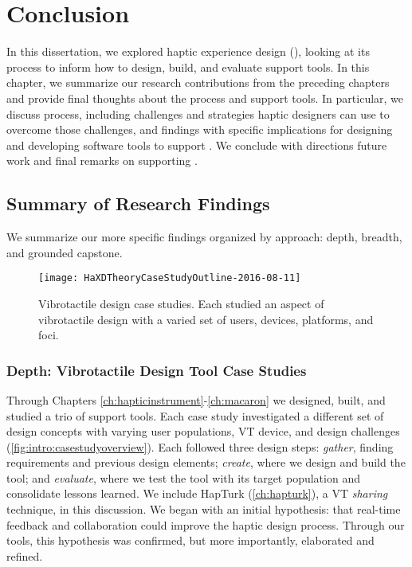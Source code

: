 \chapter{Conclusion}
\label{ch:conclusion}
In this dissertation, we explored haptic experience design (\haxd), looking at its process to inform how to design, build, and evaluate \haxd support tools.
In this chapter, we summarize our research contributions from the preceding chapters and provide final thoughts about the \haxd process and support tools.
In particular, we discuss process, including challenges and strategies haptic designers can use to overcome those challenges, and
findings with specific implications for designing and developing software tools to support \haxd.
We conclude with directions future work and final remarks on supporting \haxd.


%
%
\section{Summary of Research Findings}
We summarize our more specific findings organized by approach: depth, breadth, and grounded capstone.


\begin{figure}[htbp]
\begin{center}
\texttt{[image: HaXDTheoryCaseStudyOutline-2016-08-11]}
\caption{Vibrotactile design case studies. Each studied an aspect of vibrotactile design with a varied set of users, devices, platforms, and foci.}
\label{fig:intro:casestudyoverview}
\end{center}
\end{figure}



\subsection{Depth: Vibrotactile Design Tool Case Studies}
Through Chapters \ref{ch:hapticinstrument}-\ref{ch:macaron} we designed, built, and studied a trio of \haxd support tools.
Each case study investigated a different set of design concepts with varying user populations, VT device, and design challenges (\autoref{fig:intro:casestudyoverview}).
Each followed three design steps: \emph{gather}, finding requirements and previous design elements; \emph{create}, where we design and build the tool; and \emph{evaluate}, where we test the tool with its target population and consolidate lessons learned.
We include HapTurk (\autoref{ch:hapturk}), a VT \emph{sharing} technique, in this discussion.
We began with an initial hypothesis: that real-time feedback and collaboration could improve the haptic design process.
Through our tools, this hypothesis was confirmed, but more importantly, elaborated and refined.

